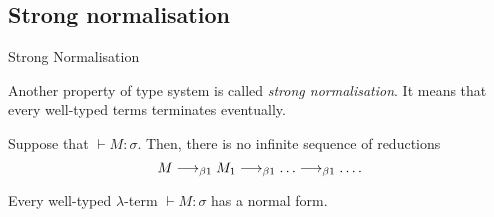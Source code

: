 \subsection{Strong normalisation}
\begin{frame}{Strong Normalisation}
  
Another property of type system is called \emph{strong normalisation}. It means
that every well-typed terms terminates eventually. 
\begin{theorem}
  Suppose that ${}\vdash M : \sigma$. Then,
  there is no infinite sequence of reductions
  \[
    M \onereduce M_1 \onereduce \dots \onereduce \dots.
  \]
\end{theorem}
\begin{corollary}
  Every well-typed $\lambda$-term ${}\vdash M:\sigma$ has a normal form.
\end{corollary}
\end{frame}

